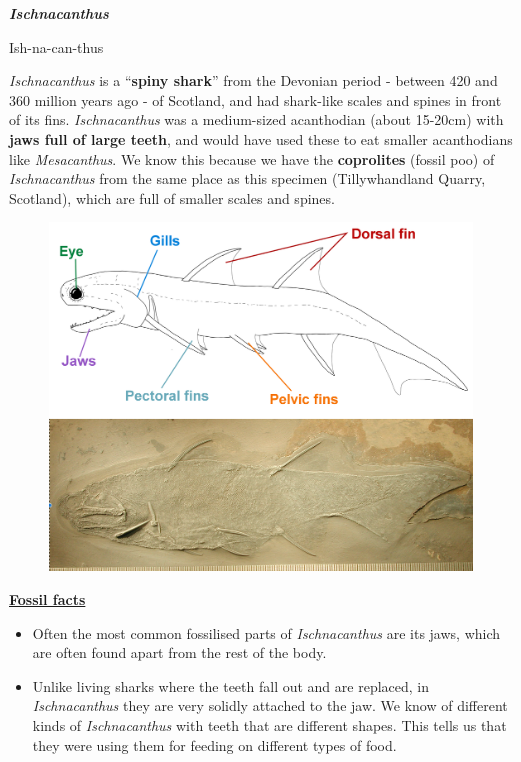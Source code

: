 \documentclass[12pt,letterpaper]{article}
\begin{document}

{\Huge\textbf{\textit{Ischnacanthus}}\par}
\vspace{3mm}
{\large{Ish-na-can-thus} \par} 
\vspace{5mm}
\textit{Ischnacanthus} is a ``\textbf{spiny shark}'' from the Devonian period - between 420 and 360 million years ago - of Scotland, and had shark-like scales and spines in front of its fins.  
\textit{Ischnacanthus} was a medium-sized acanthodian (about 15-20cm) with \textbf{jaws full of large teeth}, and would have used these to eat smaller acanthodians like \textit{Mesacanthus}.  
We know this because we have the \textbf{coprolites} (fossil poo) of \textit{Ischnacanthus} from the same place as this specimen (Tillywhandland Quarry, Scotland), which are full of smaller scales and spines.\newline

\begin{figure}[h!]
\includegraphics[scale=0.23]{Ischnacanthus}
\centering
\end{figure}

{\large\textbf{\underline{Fossil facts}}\par}

\begin{itemize}
  \item Often the most common fossilised parts of \textit{Ischnacanthus} are its jaws, which are often found apart from the rest of the body.
  \item Unlike living sharks where the teeth fall out and are replaced, in \textit{Ischnacanthus} they are very solidly attached to the jaw.  We know of different kinds of \textit{Ischnacanthus} with teeth that are different shapes.  This tells us that they were using them for feeding on different types of food.
\end{itemize}
\end{document}
